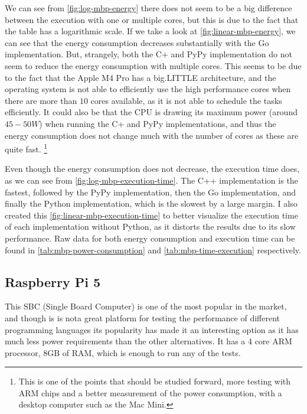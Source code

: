 

We can see from \autoref{fig:log-mbp-energy} there does not seem to be a big difference between the execution with one or multiple cores, but this is due to the fact that the table has a logarithmic scale. If we take a look at \autoref{fig:linear-mbp-energy}, we can see that the energy consumption decreases substantially with the Go implementation. But, strangely, both the C\++ and PyPy implementation do not seem to reduce the energy consumption with multiple cores. This seems to be due to the fact that the Apple M4 Pro has a big.LITTLE architecture, and the operating system is not able to efficiently use the high performance cores when there are more than $10$ cores available, as it is not able to schedule the tasks efficiently. It could also be that the CPU is drawing its maximum power (around $45-50W$) when running the C\++ and PyPy implementations, and thus the energy consumption does not change much with the number of cores as these are quite fast. \footnote{This is one of the points that should be studied forward, more testing with ARM chips and a better measurement of the power consumption, with a desktop computer such as the Mac Mini.}



Even though the energy consumption does not decrease, the execution time does, as we can see from \autoref{fig:log-mbp-execution-time}. The C++ implementation is the fastest, followed by the PyPy implementation, then the Go implementation, and finally the Python implementation, which is the slowest by a large margin. I also created this \autoref{fig:linear-mbp-execution-time} to better visualize the execution time of each implementation without Python, as it distorts the results due to its slow performance. Raw data for both energy consumption and execution time can be found in \autoref{tab:mbp-power-consumption} and \autoref{tab:mbp-time-execution} respectively.


\subsection{Raspberry Pi 5}
This SBC (Single Board Computer) is one of the most popular in the market, and though is is nota great platform for testing the performance of different programming languages its popularity has made it an interesting option as it has much less power requirements than the other alternatives. It has a 4 core ARM processor, 8GB of RAM, which is enough to run any of the tests. 


